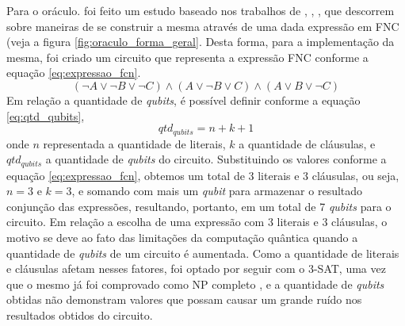 \documentclass[12pt]{article}
\begin{document}
Para o oráculo. foi feito um estudo baseado nos trabalhos de \cite{fernandes2:19}, \cite{fernandes:19}, \cite{parallelAndDistributed}, que descorrem sobre maneiras de se construir a mesma através de uma dada expressão em FNC (veja a figura \ref{fig:oraculo_forma_geral}. Desta forma, para a implementação da mesma, foi criado um circuito que representa a expressão FNC conforme a equação \ref{eq:expressao_fcn}.
\begin{equation}
(\neg A \lor \neg B \lor \neg C) \land (A \lor \neg B \lor C) \land (A \lor B \lor \neg C)\label{eq:expressao_fcn}
\end{equation}
Em relação a quantidade de \textit{qubits}, é possível definir conforme a equação \ref{eq:qtd_qubits}, 
\begin{equation}
qtd_{\textit{qubits}} = n + k + 1\label{eq:qtd_qubits}
\end{equation}
onde $n$ representada a quantidade de literais, $k$ a quantidade de cláusulas, e $qtd_{\textit{qubits}}$ a quantidade de \textit{qubits} do circuito. Substituindo os valores conforme a equação \ref{eq:expressao_fcn}, obtemos um total de 3 literais e 3 cláusulas, ou seja, $n = 3$ e $k = 3$, e somando com mais um \textit{qubit} para armazenar o resultado conjunção das expressões, resultando, portanto, em um total de 7 \textit{qubits} para o circuito. Em relação a escolha de uma expressão com $3$ literais e $3$ cláusulas, o motivo se deve ao fato das limitações da computação quântica quando a quantidade de \textit{qubits} de um circuito é aumentada. Como a quantidade de literais e cláusulas afetam nesses fatores, foi optado por seguir com o 3-SAT, uma vez que o mesmo já foi comprovado como NP completo \cite{cook:71}, e a quantidade de \textit{qubits} obtidas não demonstram valores que possam causar um grande ruído nos resultados obtidos do circuito.
\end{document}
